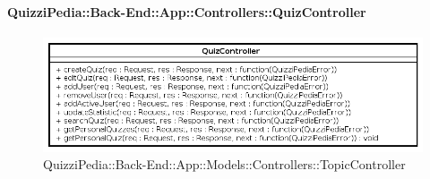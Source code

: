 \paragraph{QuizziPedia::Back-End::App::Controllers::QuizController}
\label{QuizziPedia::Back-End::App::Controllers::QuizController}
\begin{figure}[ht]
	\centering
	\includegraphics[scale=0.45]{UML/Classi/Back-End/QuizziPedia_Back-End_App_Controllers_quizController.png}
	\caption{QuizziPedia::Back-End::App::Models::Controllers::TopicController}
\end{figure}
\FloatBarrier


